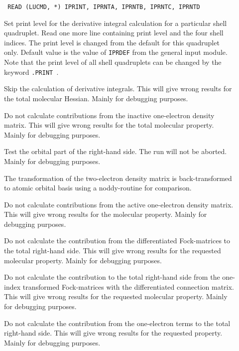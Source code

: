 \begin{description}
\item[]\verb| |\newline
\verb|READ (LUCMD, *) IPRINT, IPRNTA, IPRNTB, IPRNTC, IPRNTD|

Set print level for the derivative integral calculation for a particular shell
quadruplet.  Read one more line containing print level and the four
shell indices.  The print level is changed from the default
for this quadruplet only. Default value is the value of \verb|IPRDEF|
from the general input module. Note that the print level of all shell
quadruplets can be changed by the keyword \verb|.PRINT |.

\item[] Skip the calculation of derivative integrals.
This will give wrong results for the total molecular Hessian. Mainly
for debugging purposes.

\item[] Do not calculate contributions from the inactive
one-electron density matrix. This will give wrong results for the
total molecular property. Mainly for debugging purposes.

\item[] Test the orbital part of the right-hand side.
The run will not be aborted. Mainly for debugging purposes.

\item[] The transformation of the two-electron density
matrix is back-transformed to atomic orbital basis using a
noddy-routine for comparison.

\item[] Do not calculate contributions from the active
one-electron density matrix. This will give wrong results for the
molecular property. Mainly for debugging purposes.

\item[] Do not calculate the contribution from the
differentiated Fock-matrices to the total right-hand side. This will
give wrong results for the requested molecular property. Mainly for
debugging purposes.

\item[] Do not calculate the contribution to the total
right-hand side from the one-index transformed Fock-matrices with the
differentiated connection matrix. This will give wrong results for
the requested molecular property. Mainly for debugging purposes.

\item[] Do not calculate the contribution from the
one-electron terms to the total right-hand side. This will give wrong
results for the requested property. Mainly for debugging purposes.


\end{description}

